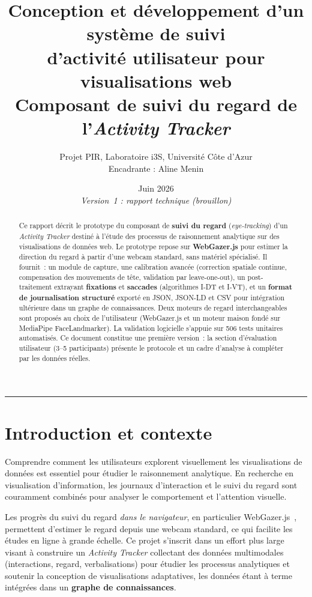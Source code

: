 \documentclass[11pt,a4paper]{article}
\title{\textbf{Conception et développement d'un système de suivi\\
d'activité utilisateur pour visualisations web}\\[4pt]
\large Composant de suivi du regard de l'\textit{Activity Tracker}}
\author{Projet PIR, Laboratoire i3S, Université Côte d'Azur\\
\small Encadrante : Aline Menin}
\date{Juin 2026 \\ \small\textit{Version~1 : rapport technique (brouillon)}}
\begin{document}
\maketitle

\begin{abstract}
\noindent
Ce rapport décrit le prototype du composant de \textbf{suivi du regard}
(\textit{eye-tracking}) d'un \textit{Activity Tracker} destiné à l'étude des
processus de raisonnement analytique sur des visualisations de données web. Le
prototype repose sur \textbf{WebGazer.js} pour estimer la direction du regard à
partir d'une webcam standard, sans matériel spécialisé. Il fournit~: un module de
capture, une calibration avancée (correction spatiale continue, compensation des
mouvements de tête, validation par leave-one-out), un post-traitement extrayant
\textbf{fixations} et \textbf{saccades} (algorithmes I-DT et I-VT), et un
\textbf{format de journalisation structuré} exporté en JSON, JSON-LD et CSV pour
intégration ultérieure dans un graphe de connaissances. Deux moteurs de regard
interchangeables sont proposés au choix de l'utilisateur (WebGazer.js et un moteur
maison fondé sur MediaPipe FaceLandmarker). La validation logicielle
s'appuie sur 506 tests unitaires automatisés. Ce document constitue une première
version~: la section d'évaluation utilisateur (3--5 participants) présente le
protocole et un cadre d'analyse à compléter par les données réelles.
\end{abstract}

\clearpage
\tableofcontents
\bigskip\hrule

\clearpage
\section{Introduction et contexte}

Comprendre comment les utilisateurs explorent visuellement les visualisations de
données est essentiel pour étudier le raisonnement analytique. En recherche en
visualisation d'information, les journaux d'interaction et le suivi du regard sont
couramment combinés pour analyser le comportement et l'attention visuelle.

Les progrès du suivi du regard \emph{dans le navigateur}, en particulier
WebGazer.js~\cite{papoutsaki2016}, permettent d'estimer le regard depuis une
webcam standard, ce qui facilite les études en ligne à grande échelle. Ce projet
s'inscrit dans un effort plus large visant à construire un \textit{Activity
Tracker} collectant des données multimodales (interactions, regard,
verbalisations) pour étudier les processus analytiques et soutenir la conception
de visualisations adaptatives, les données étant à terme intégrées dans un
\textbf{graphe de connaissances}.
\end{document}
